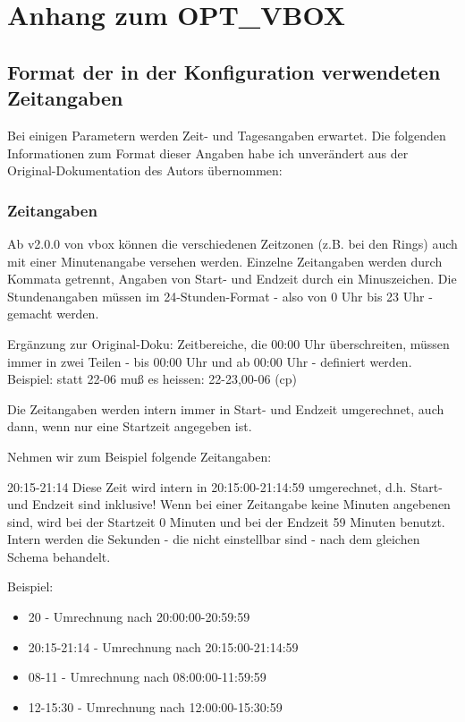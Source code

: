 \section {Anhang zum OPT\_VBOX}

\subsection{Format der in der Konfiguration verwendeten Zeitangaben}

Bei einigen Parametern werden Zeit- und Tagesangaben erwartet. Die folgenden 
Informationen zum Format dieser Angaben habe ich unverändert aus der 
Original-Dokumentation des Autors übernommen:

\subsubsection{Zeitangaben}
Ab v2.0.0 von vbox können die verschiedenen Zeitzonen (z.B. bei den  Rings) auch 
mit einer Minutenangabe versehen werden.
Einzelne Zeitangaben werden durch Kommata getrennt, Angaben von Start- und Endzeit 
durch ein Minuszeichen. Die Stundenangaben müssen im 24-Stunden-Format 
- also von 0 Uhr bis 23 Uhr - gemacht werden.

Ergänzung zur Original-Doku: 
Zeitbereiche, die 00:00 Uhr überschreiten, müssen immer 
in zwei Teilen - bis 00:00 Uhr und ab 00:00 Uhr - definiert werden. 
Beispiel: statt 22-06 muß es heissen: 22-23,00-06  (cp)

Die Zeitangaben werden intern immer in Start- und Endzeit umgerechnet, auch dann, 
wenn nur eine Startzeit angegeben ist.

Nehmen wir zum Beispiel folgende Zeitangaben:

20:15-21:14
Diese Zeit wird intern in 20:15:00-21:14:59 umgerechnet, d.h. Start- und Endzeit 
sind inklusive!
Wenn bei einer Zeitangabe keine Minuten angebenen sind, wird bei der Startzeit 
0 Minuten und bei der Endzeit 59 Minuten benutzt. Intern werden die Sekunden 
- die nicht einstellbar sind - nach dem gleichen Schema behandelt.

Beispiel:
\begin{itemize}
    \item 20 - Umrechnung nach 20:00:00-20:59:59
    \item 20:15-21:14 - Umrechnung nach 20:15:00-21:14:59
    \item 08-11 - Umrechnung nach 08:00:00-11:59:59
    \item 12-15:30 - Umrechnung nach 12:00:00-15:30:59
\end{itemize}

